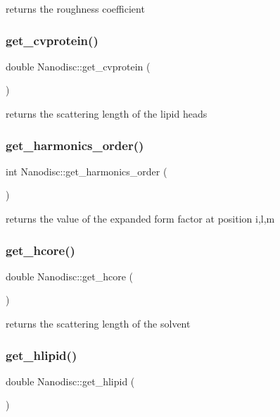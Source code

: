 returns the roughness coefficient \mbox{\label{class_nanodisc_a051d2db01fe011def7065b669ce1958e}} 
\subsubsection{\texorpdfstring{get\_cvprotein()}{get\_cvprotein()}}
{\footnotesize\ttfamily double Nanodisc\+::get\+\_\+cvprotein (\begin{DoxyParamCaption}{ }\end{DoxyParamCaption})}

returns the scattering length of the lipid heads \mbox{\label{class_nanodisc_a4fe3dd5c723dd714ebecbb575cf842c9}} 
\subsubsection{\texorpdfstring{get\_harmonics\_order()}{get\_harmonics\_order()}}
{\footnotesize\ttfamily int Nanodisc\+::get\+\_\+harmonics\+\_\+order (\begin{DoxyParamCaption}{ }\end{DoxyParamCaption})}

returns the value of the expanded form factor at position i,l,m \mbox{\label{class_nanodisc_ad16b4f61aa880a7e1b48bbde08fdeec9}} 
\subsubsection{\texorpdfstring{get\_hcore()}{get\_hcore()}}
{\footnotesize\ttfamily double Nanodisc\+::get\+\_\+hcore (\begin{DoxyParamCaption}{ }\end{DoxyParamCaption})}

returns the scattering length of the solvent \mbox{\label{class_nanodisc_a7f8ff2d00e921210a591d3488f16db84}} 
\subsubsection{\texorpdfstring{get\_hlipid()}{get\_hlipid()}}
{\footnotesize\ttfamily double Nanodisc\+::get\+\_\+hlipid (\begin{DoxyParamCaption}{ }\end{DoxyParamCaption})}

